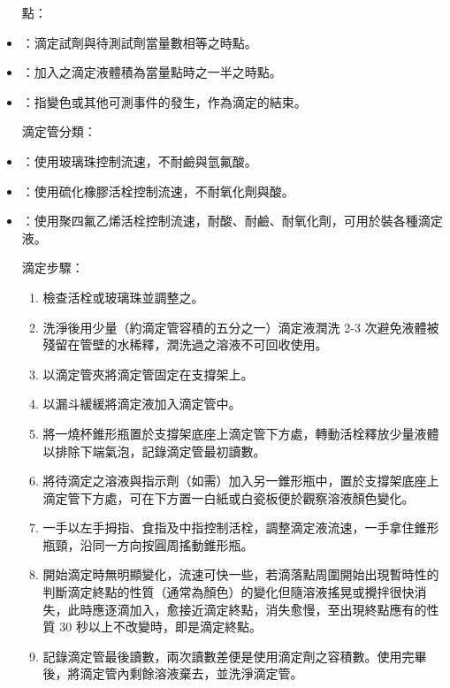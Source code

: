 \documentclass[a4paper,12pt]{article}
\begin{document}
\begin{itemize}
點：
\bit
\item {}：滴定試劑與待測試劑當量數相等之時點。
\item {}：加入之滴定液體積為當量點時之一半之時點。
\item {}：指變色或其他可測事件的發生，作為滴定的結束。
\eit

滴定管分類：
\bit
\item {}：使用玻璃珠控制流速，不耐鹼與氫氟酸。
\item {}：使用硫化橡膠活栓控制流速，不耐氧化劑與酸。
\item {}：使用聚四氟乙烯活栓控制流速，耐酸、耐鹼、耐氧化劑，可用於裝各種滴定液。
\eit

滴定步驟：
\begin{enumerate}
\item 檢查活栓或玻璃珠並調整之。
\item 洗淨後用少量（約滴定管容積的五分之一）滴定液潤洗 2-3 次避免液體被殘留在管壁的水稀釋，潤洗過之溶液不可回收使用。
\item 以滴定管夾將滴定管固定在支撐架上。
\item 以漏斗緩緩將滴定液加入滴定管中。
\item 將一燒杯錐形瓶置於支撐架底座上滴定管下方處，轉動活栓釋放少量液體以排除下端氣泡，記錄滴定管最初讀數。
\item 將待滴定之溶液與指示劑（如需）加入另一錐形瓶中，置於支撐架底座上滴定管下方處，可在下方置一白紙或白瓷板便於觀察溶液顏色變化。
\item 一手以左手拇指、食指及中指控制活栓，調整滴定液流速，一手拿住錐形瓶頸，沿同一方向按圓周搖動錐形瓶。
\item 開始滴定時無明顯變化，流速可快一些，若滴落點周圍開始出現暫時性的判斷滴定終點的性質（通常為顏色）的變化但隨溶液搖晃或攪拌很快消失，此時應逐滴加入，愈接近滴定終點，消失愈慢，至出現終點應有的性質 30 秒以上不改變時，即是滴定終點。
\item 記錄滴定管最後讀數，兩次讀數差便是使用滴定劑之容積數。使用完畢後，將滴定管內剩餘溶液棄去，並洗淨滴定管。
\end{enumerate}


\end{itemize}
\end{document}
